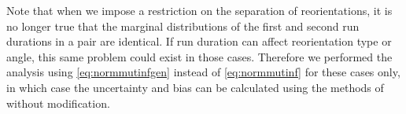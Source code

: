 \documentclass[12pt]{article}
\begin{document}
Note that when we impose a restriction on the separation of reorientations, it is no longer true that the marginal distributions of the first and second run durations in a pair are identical. If run duration can affect reorientation type or angle, this same problem could exist in those cases. Therefore we performed the analysis using \eqref{eq:normmutinfgen} instead of \eqref{eq:normmutinf} for these cases only, in which case the uncertainty and bias can be calculated using the methods of \cite{Roulston1999} without modification.

\end{document}
